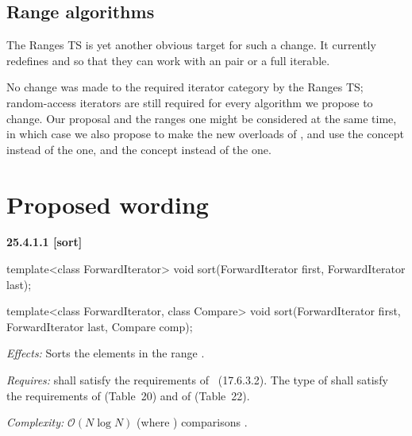 \documentclass{isocpp_proposal}
\begin{document}
\subsection{Range algorithms}

The Ranges TS \cite{N4560} is yet another obvious target for such a change. It currently redefines  and  so that they can work with an \tcode{[iterator, sentinel)} pair or a full iterable.

\vspace{0.3cm}

No change was made to the required iterator category by the Ranges TS; random-access iterators are still required for every algorithm we propose to change. Our proposal and the ranges one might be considered at the same time, in which case we also propose to make the new overloads of ,  and  use the  concept instead of the  one, and the  concept instead of the  one.

\section{Proposed wording}

\textbf{25.4.1.1  [sort]}

\begin{itemdecl}
template<class ForwardIterator>
  void sort(ForwardIterator first, ForwardIterator last);

template<class ForwardIterator, class Compare>
  void sort(ForwardIterator first, ForwardIterator last,
            Compare comp);
\end{itemdecl}

\begin{itemdescr}
\pnum
\emph{Effects:} Sorts the elements in the range \tcode{[first, last)}.

\pnum
\emph{Requires:}  shall satisfy the requirements of
~(17.6.3.2). The type of  shall satisfy the requirements of  (Table~20) and of  (Table~22).

\pnum
\emph{Complexity:} $\mathcal{O}(N \log{} N)$ (where ) comparisons .
\end{itemdescr}
\end{document}
